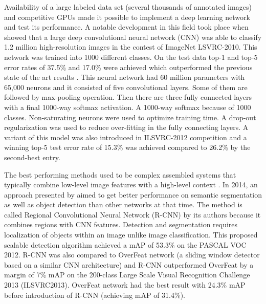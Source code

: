 \documentclass[11pt]{article}
\begin{document}
Availability of a large labeled data set (several thousands of annotated images) and competitive GPUs made it possible to implement a deep learning network and test its performance. A notable development in this field took place when \cite{krizhevsky2012imagenet} showed that a large deep convolutional neural network (CNN)  was able to classify 1.2 million high-resolution images in the contest of ImageNet LSVRC-2010. This network was trained into 1000 different classes. On the test data top-1 and top-5 error rates of 37.5\% and 17.0\% were achieved which outperformed the previous state of the art results \cite{krizhevsky2012imagenet}. This neural network had 60 million parameters with 65,000 neurons and it consisted of five convolutional layers. Some of them are followed by max-pooling operation. Then there are three fully connected layers with a final 1000-way softmax activation. A 1000-way softmax because of 1000 classes. Non-saturating neurons were used to optimize training time. A drop-out regularization was used to reduce over-fitting in the fully connecting layers. A variant of this model was also introduced in ILSVRC-2012 competition and a winning top-5 test error rate of 15.3\% was achieved
compared to 26.2\% by the second-best entry.

The best performing methods used to be complex assembled systems that typically combine low-level image features with a high-level context \cite{girshick_rich_2013}. In 2014, an approach presented by \cite{girshick_rich_2013} aimed to get better performance on semantic segmentation as well as object detection than other networks at that time. The method is called Regional Convolutional Neural Network (R-CNN) by its authors because it combines regions with CNN features. Detection and segmentation requires localization of objects within an image unlike image classification. This proposed scalable detection algorithm achieved a mAP of 53.3\% on the PASCAL VOC 2012. R-CNN was also compared to OverFeat network (a sliding window detector based on a similar CNN architecture) and R-CNN outperformed OverFeat by a margin of 7\% mAP on the 200-class Large Scale Visual Recognition Challenge 2013 (ILSVRC2013). OverFeat network had the best result with 24.3\% mAP before introduction of R-CNN (achieving mAP of 31.4\%).
\end{document}
